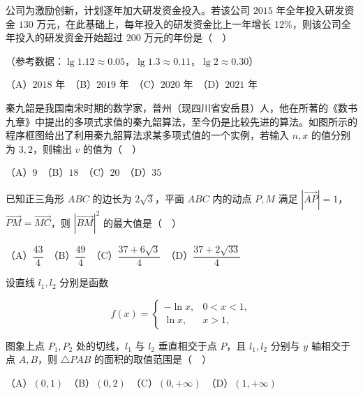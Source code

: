 \begin{question}
公司为激励创新，计划逐年加大研发资金投入。若该公司 \(2015\) 年全年投入研发资金 \(130\) 万元，在此基础上，每年投入的研发资金比上一年增长 12\%，则该公司全年投入的研发资金开始超过 \(200\) 万元的年份是（　）

（参考数据：\(\lg 1.12\approx 0.05\)，\(\lg 1.3\approx 0.11\)，\(\lg 2\approx 0.30\)）

（A）\(2018\) 年　（B）\(2019\) 年　（C）\(2020\) 年　（D）\(2021\) 年

\Needspace{0.4\textheight}
\end{question}
\begin{question}
秦九韶是我国南宋时期的数学家，普州（现四川省安岳县）人，他在所著的《数书九章》中提出的多项式求值的秦九韶算法，至今仍是比较先进的算法。如图所示的程序框图给出了利用秦九韶算法求某多项式值的一个实例，若输入 \(n,x\) 的值分别为 \(3,2\)，则输出 \(v\) 的值为（　）
\nopagebreak[4]
\begin{center}\end{center}
\nopagebreak[4]
（A）\(9\)　（B）\(18\)　（C）\(20\)　（D）\(35\)

\end{question}
\begin{question}
已知正三角形 \(ABC\) 的边长为 \(2\sqrt{3}\)，平面 \(ABC\) 内的动点 \(P,M\) 满足 \(\left|\overrightarrow{AP}\right|=1\)，\(\overrightarrow{PM}=\overrightarrow{MC}\)，则 \(\left|\overrightarrow{BM}\right|^{2}\) 的最大值是（　）

（A）\(\dfrac{43}{4}\)　（B）\(\dfrac{49}{4}\)　（C）\(\dfrac{37+6\sqrt{3}}{4}\)　（D）\(\dfrac{37+2\sqrt{33}}{4}\)

\end{question}
\begin{question}
设直线 \(l_{1},l_{2}\) 分别是函数

\nopagebreak[4]
\[
f(x)=\begin{cases}
-\ln x, & 0<x<1,\\
\ln x, & x>1,
\end{cases}
\]

图象上点 \(P_{1},P_{2}\) 处的切线，\(l_{1}\) 与 \(l_{2}\) 垂直相交于点 \(P\)，且 \(l_{1},l_{2}\) 分别与 \(y\) 轴相交于点 \(A,B\)，则 \(\triangle PAB\) 的面积的取值范围是（　）

（A）\((0,1)\)　（B）\((0,2)\)　（C）\((0,+\infty)\)　（D）\((1,+\infty)\)

\end{question}


